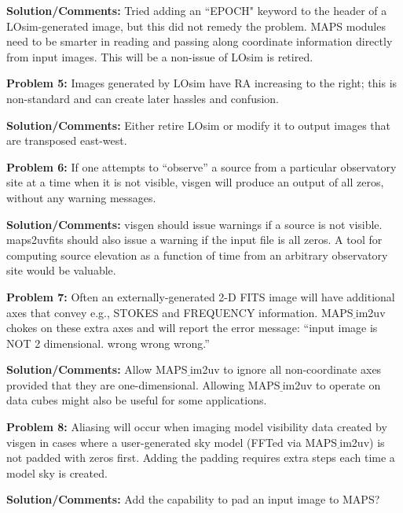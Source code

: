 \documentclass[12pt]{article}
\begin{document}
\begin{flushleft}
{\bf Solution/Comments:} Tried adding an ``EPOCH" keyword to the header of a
LOsim-generated image, but this did not remedy the problem. 
MAPS modules need to be smarter in reading and passing
along coordinate information directly from input images. This will be
a non-issue of {\sf LOsim} is retired.

\bigskip

{\bf {\color{red}Problem 5:}} Images generated by {\sf LOsim} 
have RA increasing to the right; this is non-standard and 
can create later hassles and confusion.

{\bf Solution/Comments:} Either retire {\sf LOsim} or modify it 
to output images that are
transposed east-west.

\bigskip


{\bf {\color{red}Problem 6:}} If one attempts to ``observe'' a source from a particular 
observatory site at a time when it is not visible, 
{\sf visgen} will  produce an
output of all zeros, without any warning messages.

{\bf Solution/Comments:} {\sf visgen} should issue warnings if a source is not
visible. {\sf maps2uvfits} should also issue a warning if the input
file is all zeros. A tool for computing source elevation as a function of time
from an arbitrary observatory site would be valuable.

\bigskip

{\bf {\color{red}Problem 7:}} Often an externally-generated 
2-D FITS image will have additional axes that convey
e.g., STOKES and FREQUENCY information. {\sf MAPS$\underline~$im2uv}
chokes on these extra axes and will report the error message: 
``input image is NOT 2 dimensional. wrong wrong wrong.'' 

{\bf Solution/Comments:} Allow {\sf MAPS$\underline~$im2uv} 
to ignore all non-coordinate axes
provided that they are one-dimensional. Allowing {\sf
  MAPS$\underline~$im2uv} to operate on data cubes might also be
useful for some applications.

\bigskip

{\bf {\color{red}Problem 8:}} Aliasing will occur when imaging model 
visibility data 
created by {\sf visgen} in cases where a user-generated sky
model (FFTed via {\sf MAPS$\underline~$im2uv}) is not padded with
zeros first. 
Adding the padding requires  extra steps each time a model sky
is created.

{\bf Solution/Comments:} Add the capability to pad an input image to 
MAPS?

\bigskip


\end{flushleft}
\end{document}
